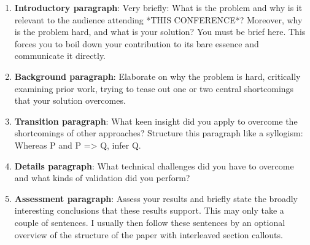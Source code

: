 \begin{enumerate}
\item {\bf Introductory paragraph}: Very briefly: What is the problem and
        why is it relevant to the audience attending *THIS CONFERENCE*?
        Moreover, why is the problem hard, and what is your solution?
        You must be brief here. This forces you to boil down your
        contribution to its bare essence and communicate it directly.

\item {\bf Background paragraph}: Elaborate on why the problem is hard,
        critically examining prior work, trying to tease out one
        or two central shortcomings that your solution overcomes.

\item {\bf Transition paragraph}: What keen insight did you apply
        to overcome the shortcomings of other approaches?
        Structure this paragraph like a syllogism:
        Whereas P and P => Q, infer Q.

\item {\bf Details paragraph}: What technical challenges did you have
        to overcome and what kinds of validation did you perform?

\item {\bf Assessment paragraph}: Assess your results and briefly state
        the broadly interesting conclusions that these results
        support. This may only take a couple of sentences. I
        usually then follow these sentences by an optional
        overview of the structure of the paper with interleaved
        section callouts.
\end{enumerate}

